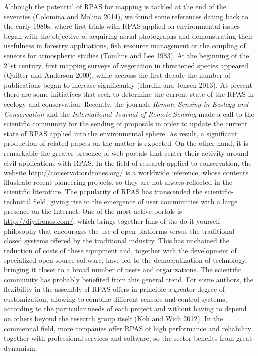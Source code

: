 \documentclass[]{interact}
\theoremstyle{plain}%
\theoremstyle{definition}
\theoremstyle{remark}
\begin{document}
Although the potential of RPAS for mapping is tackled at the end of the
seventies (Colomina and Molina 2014), we found some references dating
back to the early 1980s, where first trials with RPAS applied on
environmental issues began with the objective of acquiring aerial
photographs and demonstrating their usefulness in forestry applications,
fish resource management or the coupling of sensors for atmospheric
studies (Tomlins and Lee 1983). At the beginning of the 21st century,
first mapping surveys of vegetation in threatened species appeared
(Quilter and Anderson 2000), while accross the first decade the number
of publications began to increase significantly (Hardin and Jensen
2013). At present there are some initiatives that seek to determine the
current state of the RPAS in ecology and conservation. Recently, the
journals \emph{Remote Sensing in Ecology and Conservation} and the
\emph{International Journal of Remote Sensing} made a call to the
scientific community for the sending of proposals in order to update the
current state of RPAS applied into the environmental sphere. As result,
a significant production of related papers on the matter is expected. On
the other hand, it is remarkable the greater presence of web portals
that center their activity around civil applications with RPAS. In the
field of research applied to conservation, the website
\url{http://conservationdrones.org/} is a worldwide reference, whose
contents illustrate recent pioneering projects, so they are not always
reflected in the scientific literature. The popularity of RPAS has
transcended the scientific-technical field, giving rise to the emergence
of user communities with a large presence on the Internet. One of the
most active portals is \url{http://diydrones.com/}, which brings
together fans of the do-it-yourself philosophy that encourages the use
of open platforms versus the traditional closed systems offered by the
traditional industry. This has unchained the reduction of costs of these
equipment and, together with the development of specialized open source
software, have led to the democratization of technology, bringing it
closer to a broad number of users and organizations. The scientific
community has probably benefited from this general trend. For some
authors, the flexibility in the assembly of RPAS offers in principle a
greater degree of customization, allowing to combine different sensors
and control systems, according to the particular needs of each project
and without having to depend on others beyond the research group itself
(Koh and Wich 2012). In the commercial field, more companies offer RPAS
of high performance and reliability together with professional services
and software, so the sector benefits from great dynamism.
\end{document}
